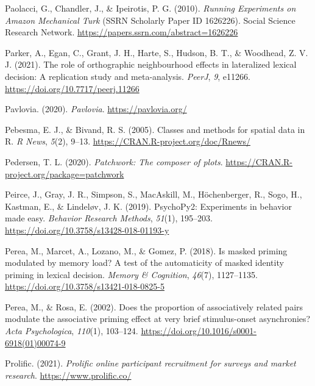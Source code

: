 \documentclass[
  english,
  man,floatsintext]{apa6}
\newlength{\cslhangindent}
\newlength{\cslentryspacingunit} %
\newenvironment{CSLReferences}[2] %
 {%
  \setlength{\parindent}{0pt}
  \ifodd #1
  \let\oldpar\par
  \def\par{\hangindent=\cslhangindent\oldpar}
  \fi
  \setlength{\parskip}{#2\cslentryspacingunit}
 }%
 {}
\begin{document}
\begin{CSLReferences}{1}{0}
\leavevmode{}%
Paolacci, G., Chandler, J., \& Ipeirotis, P. G. (2010). \emph{Running {Experiments} on {Amazon Mechanical Turk}} (SSRN Scholarly Paper ID 1626226). {Social Science Research Network}. \url{https://papers.ssrn.com/abstract=1626226}

\leavevmode{}%
Parker, A., Egan, C., Grant, J. H., Harte, S., Hudson, B. T., \& Woodhead, Z. V. J. (2021). The role of orthographic neighbourhood effects in lateralized lexical decision: A replication study and meta-analysis. \emph{{PeerJ}}, \emph{9}, e11266. \url{https://doi.org/10.7717/peerj.11266}

\leavevmode{}%
Pavlovia. (2020). \emph{Pavlovia}. \url{https://pavlovia.org/}

\leavevmode{}%
Pebesma, E. J., \& Bivand, R. S. (2005). Classes and methods for spatial data in {R}. \emph{R News}, \emph{5}(2), 9--13. \url{https://CRAN.R-project.org/doc/Rnews/}

\leavevmode{}%
Pedersen, T. L. (2020). \emph{Patchwork: The composer of plots}. \url{https://CRAN.R-project.org/package=patchwork}

\leavevmode{}%
Peirce, J., Gray, J. R., Simpson, S., MacAskill, M., Höchenberger, R., Sogo, H., Kastman, E., \& Lindeløv, J. K. (2019). PsychoPy2: Experiments in behavior made easy. \emph{Behavior Research Methods}, \emph{51}(1), 195--203. \url{https://doi.org/10.3758/s13428-018-01193-y}

\leavevmode{}%
Perea, M., Marcet, A., Lozano, M., \& Gomez, P. (2018). Is masked priming modulated by memory load? A test of the automaticity of masked identity priming in lexical decision. \emph{Memory {\&} Cognition}, \emph{46}(7), 1127--1135. \url{https://doi.org/10.3758/s13421-018-0825-5}

\leavevmode{}%
Perea, M., \& Rosa, E. (2002). Does the proportion of associatively related pairs modulate the associative priming effect at very brief stimulus-onset asynchronies? \emph{Acta Psychologica}, \emph{110}(1), 103--124. \url{https://doi.org/10.1016/s0001-6918(01)00074-9}

\leavevmode{}%
Prolific. (2021). \emph{Prolific \textbar{} online participant recruitment for surveys and market research}. \url{https://www.prolific.co/}


\end{CSLReferences}
\end{document}
